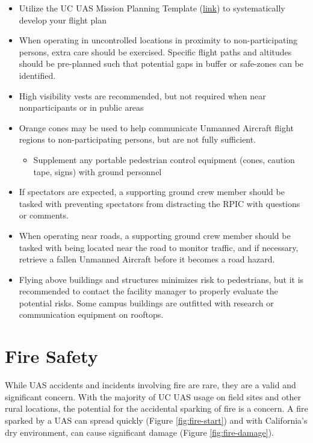 \documentclass[
]{book}
\providecommand{\tightlist}{%
  \setlength{\itemsep}{0pt}\setlength{\parskip}{0pt}}
\begin{document}
\begin{itemize}
\tightlist
\item
  Utilize the UC UAS Mission Planning Template (\href{http://ucdrones.github.io/library/mission_planning_template.docx}{link}) to systematically develop your flight plan
\item
  When operating in uncontrolled locations in proximity to non-participating persons, extra care should be exercised. Specific flight paths and altitudes should be pre-planned such that potential gaps in buffer or safe-zones can be identified.
\item
  High visibility vests are recommended, but not required when near nonparticipants or in public areas
\item
  Orange cones may be used to help communicate Unmanned Aircraft flight regions to non-participating persons, but are not fully sufficient.

  \begin{itemize}
  \tightlist
  \item
    Supplement any portable pedestrian control equipment (cones, caution tape, signs) with ground personnel
  \end{itemize}
\item
  If spectators are expected, a supporting ground crew member should be tasked with preventing spectators from distracting the RPIC with questions or comments.
\item
  When operating near roads, a supporting ground crew member should be tasked with being located near the road to monitor traffic, and if necessary, retrieve a fallen Unmanned Aircraft before it becomes a road hazard.
\item
  Flying above buildings and structures minimizes risk to pedestrians, but it is recommended to contact the facility manager to properly evaluate the potential risks. Some campus buildings are outfitted with research or communication equipment on rooftops.
\end{itemize}

\hypertarget{ch-fire-safety}{%
\chapter{Fire Safety}\label{ch-fire-safety}}

While UAS accidents and incidents involving fire are rare, they are a valid and significant concern. With the majority of UC UAS usage on field sites and other rural locations, the potential for the accidental sparking of fire is a concern. A fire sparked by a UAS can spread quickly (Figure \ref{fig:fire-start}) and with California's dry environment, can cause significant damage (Figure \ref{fig:fire-damage}).
\end{document}
